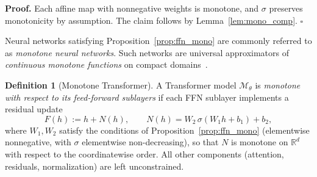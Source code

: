 \documentclass{article}
\theoremstyle{plain}
\newtheorem{proposition}[theorem]{Proposition}
\theoremstyle{definition}
\newtheorem{definition}[theorem]{Definition}
\theoremstyle{remark}
\begin{document}

\textbf{Proof.} Each affine map with nonnegative weights is monotone, and $\sigma$ preserves monotonicity by assumption. The claim follows by Lemma~\ref{lem:mono_comp}. \hfill $\square$

Neural networks satisfying Proposition~\ref{prop:ffn_mono} are commonly referred to as \emph{monotone neural networks}. Such networks are universal approximators of \emph{continuous monotone functions} on compact domains~\cite{Daniels2010Monotone}.




\begin{definition}[Monotone Transformer]
\label{def:mono_transformer}
A Transformer model $\mathcal{M}_\theta$ is \emph{monotone with respect to its feed-forward sublayers}
if each FFN sublayer implements a residual update
\[
F(h) := h + N(h), \qquad N(h) = W_2\, \sigma(W_1 h + b_1) + b_2,
\]
where $W_1, W_2$ satisfy the conditions of Proposition~\ref{prop:ffn_mono} (elementwise
nonnegative, with $\sigma$ elementwise non-decreasing), so that $N$ is monotone on
$\mathbb{R}^d$ with respect to the coordinatewise order. All other components
(attention, residuals, normalization) are left unconstrained.
\end{definition}
\end{document}
